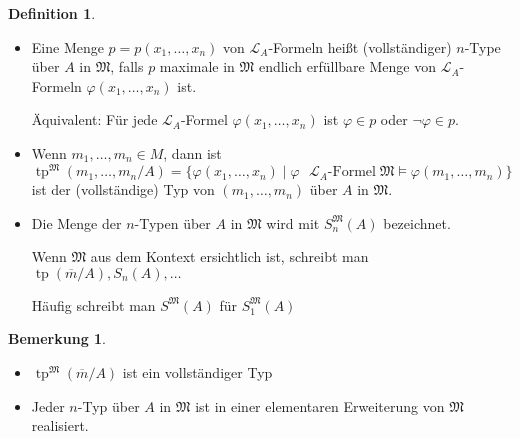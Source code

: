 \documentclass[12pt,parskip=full]{scrartcl}
\theoremstyle{definition}
\newtheorem{definition}[theorem]{Definition}
\newtheorem{remark}[theorem]{Bemerkung}
\begin{document}
 	\begin{definition}
 		\begin{itemize}
 			\item Eine Menge $p = p(x_1, \dots, x_n)$ von $\mathcal{L}_A$-Formeln heißt (vollständiger) $n$-Type über $A$ in $\mathfrak{M}$, falls $p$ maximale in $\mathfrak{M}$ endlich erfüllbare Menge von $\mathcal{L}_A$-Formeln $\varphi(x_1, \dots, x_n)$ ist.
 			
 			Äquivalent: Für jede $\mathcal{L}_A$-Formel $\varphi(x_1, \dots, x_n)$ ist $\varphi \in p$ oder $\lnot \varphi \in p$.
 			\item Wenn $m_1, \dots, m_n \in M$, dann ist
 			\begin{equation*}
	 			\operatorname{tp}^\mathfrak{M}(m_1, \dots, m_n/A) = \{ \varphi(x_1, \dots, x_n) \mid \varphi \text{ $\mathcal{L}_A$-Formel} \; \mathfrak{M} \models \varphi(m_1, \dots, m_n) \}
 			\end{equation*}
 			ist der (vollständige) Typ von $(m_1, \dots, m_n)$ über $A$ in $\mathfrak{M}$.
 			\item Die Menge der $n$-Typen über $A$ in $\mathfrak{M}$ wird mit $S_n^\mathfrak{M}(A)$ bezeichnet.
 			
 			Wenn $\mathfrak{M}$ aus dem Kontext ersichtlich ist, schreibt man $\operatorname{tp}(\overline{m}/A), S_n(A), \dots$
 			
 			Häufig schreibt man $S^\mathfrak{M}(A)$ für $S_1^\mathfrak{M}(A)$
 		\end{itemize}
 	\end{definition}
 
 	\begin{remark}
 		\begin{itemize}
 			\item $\operatorname{tp}^\mathfrak{M}(\overline{m}/A)$ ist ein vollständiger Typ
 			\item Jeder $n$-Typ über $A$ in $\mathfrak{M}$ ist in einer elementaren Erweiterung von $\mathfrak{M}$ realisiert.
 		\end{itemize}
 	\end{remark}
 
\end{document}

